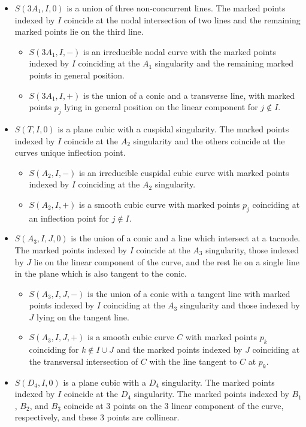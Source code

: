\documentclass{amsart}
\numberwithin{equation}{section}
\theoremstyle{definition}
\begin{document}
\begin{thm:wallcrossing}
\begin{itemize}
\item[(Case i)] $S(3A_1,I,0)$ is a union of three non-concurrent lines. The marked points indexed by $I$ coincide at the nodal intersection of two lines and the remaining marked points lie on the third line.
\begin{itemize}
    \item[$\bullet$] $S(3A_1,I,-)$ is an irreducible nodal curve with the marked points indexed by $I$ coinciding at the  $A_1$ singularity and the remaining marked points in general position.
    \item[$\bullet$] $S(3A_1,I,+)$ is the union of a conic and a transverse line, with marked points $p_j$ lying in general position on the linear component for $j \notin I.$
\end{itemize}
\item[(Case ii)] $S(T,I,0)$ is a plane cubic with a cuspidal singularity. The marked points indexed by $I$ coincide at the $A_2$ singularity and the others coincide at the curves unique inflection point.
\begin{itemize}
    \item[$\bullet$] $S(A_2,I, -)$ is an irreducible cuspidal cubic curve with marked points indexed by $I$ coinciding at the $A_2$ singularity.
    \item[$\bullet$] $S(A_2,I,+)$ is a smooth cubic curve with marked points $p_j$ coinciding at an inflection point for $j \notin I$. 
\end{itemize}
\item[(Case iii)] $S(A_3,I,J,0)$ is the union of a conic and a line which intersect at a tacnode. The marked points indexed by $I$ coincide at the $A_3$ singularity, those indexed by $J$ lie on the linear component of the curve, and the rest lie on a single line in the plane which is also tangent to the conic.
    \begin{itemize}
      \item[$\bullet$] $S(A_3, I, J,-)$ is the union of a conic with a tangent line with marked points indexed by $I$ coinciding at the $A_3$ singularity and those indexed by $J$ lying on the tangent line.
     \item[$\bullet$] $S(A_3,I,J,+)$ is a smooth cubic curve $C$ with marked points $p_k$ coinciding for $k \notin I \cup J$ and the marked points indexed by $J$ coinciding at the transversal intersection of $C$ with the line tangent to $C$ at $p_k$.
    \end{itemize}
    \item[(Case iv)] $S(D_4,I,0)$ is a plane cubic with a $D_4$ singularity. The marked points indexed by $I$ coincide at the $D_4$ singularity. The marked points indexed by $B_1$, $B_2$, and $B_3$ coincide at $3$ points on the $3$ linear component of the curve, respectively, and these $3$ points are collinear.

\end{itemize}
\end{thm:wallcrossing}
\end{document}
